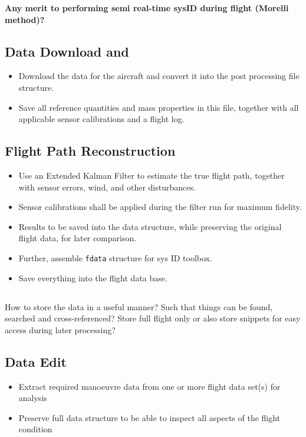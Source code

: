 \documentclass[11pt,a4paper]{article}
\begin{document}
\textbf{Any merit to performing semi real-time sysID during flight (Morelli method)?}

\subsection{Data Download and \color{red}{File Structure}}

\begin{itemize}
\item Download the data for the aircraft and convert it into the post processing file structure.
\item Save all reference quantities and mass properties in this file, together with all applicable sensor calibrations and a flight log.
\end{itemize}

\subsection{Flight Path Reconstruction}

\begin{itemize}
\item Use an Extended Kalman Filter to estimate the true flight path, together with sensor errors, wind, and other disturbances.
\item Sensor calibrations shall be applied during the filter run for maximum fidelity.
\item Results to be saved into the data structure, while preserving the original flight data, for later comparison.
\item Further, assemble \texttt{fdata} structure for sys ID toolbox.
\item Save everything into the flight data base.
\end{itemize}

\subsection{\color{red}{Flight Data Base}}
How to store the data in a useful manner? Such that things can be found, searched and cross-referenced? Store full flight only or also store snippets for easy access during later processing?

\subsection{Data Edit}

\begin{itemize}
\item Extract required manoeuvre data from one or more flight data set(s) for analysis
\item Preserve full data structure to be able to inspect all aspects of the flight condition 
\end{itemize}
\end{document}
